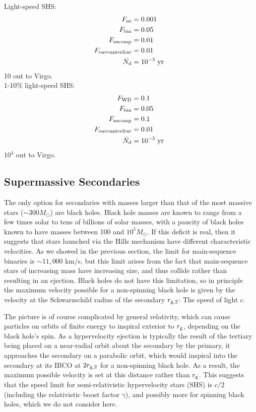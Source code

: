 \documentclass[a4paper,twocolumn]{emulateapj}
\begin{document}
Light-speed SHS:
\begin{align}
F_{\rm ns} &= 0.001\\
F_{\rm bin} &= 0.05\\
F_{\rm ns comp} &= 0.01\\
F_{\rm encounterfrac} &= 0.01\\
\dot{N}_{\rm d} &= 10^{-5}\;{\rm yr}
\end{align}
10 out to Virgo.\\

1-10\% light-speed SHS:
\begin{align}
F_{\rm WD} &= 0.1\\
F_{\rm bin} &= 0.05\\
F_{\rm ns comp} &= 0.1\\
F_{\rm encounterfrac} &= 0.01\\
\dot{N}_{\rm d} &= 10^{-5}\;{\rm yr}
\end{align}
$10^4$ out to Virgo.

\subsection{Supermassive Secondaries}
The only option for secondaries with masses larger than that of the most massive stars ($\sim 300 M_{\odot}$) are black holes. Black hole masses are known to range from a few times solar to tens of billions of solar masses, with a paucity of black holes known to have masses between 100 and $10^{5} M_{\odot}$. If this deficit is real, then it suggests that stars launched via the Hills mechanism have different characteristic velocities. As we showed in the previous section, the limit for main-sequence binaries is $\sim 11,000$ km/s, but this limit arises from the fact that main-sequence stars of increasing mass have increasing size, and thus collide rather than resulting in an ejection. Black holes do not have this limitation, so in principle the maximum velocity possible for a non-spinning black hole is given by the velocity at the Schwarzschild radius of the secondary $r_{\rm g,2}$: The speed of light $c$.

The picture is of course complicated by general relativity, which can cause particles on orbits of finite energy to inspiral exterior to $r_{\rm g}$, depending on the black hole's spin. As a hypervelocity ejection is typically the result of the tertiary being placed on a near-radial orbit about the secondary by the primary, it approaches the secondary on a parabolic orbit, which would inspiral into the secondary at its IBCO at $2 r_{\rm g,2}$ for a non-spinning black hole. As a result, the maximum possible velocity is set at this distance rather than $r_{\rm g}$. This suggests that the speed limit for semi-relativistic hypervelocity stars (SHS) is $c/2$ (including the relativistic boost factor $\gamma$), and possibly more for spinning black holes, which we do not consider here.
\end{document}
